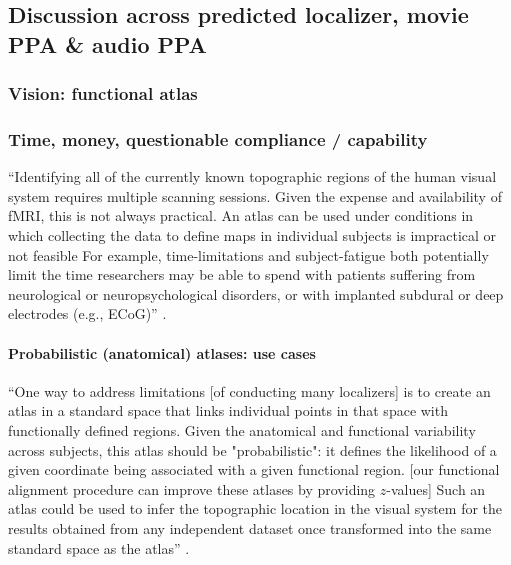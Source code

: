\subsection{Discussion across predicted localizer, movie PPA \& audio PPA}


\subsubsection{Vision: functional atlas}





\subsubsection{Time, money, questionable compliance / capability}

``Identifying all of the currently known topographic regions of the human visual
system requires multiple scanning sessions.
%
Given the expense and availability of fMRI, this is not always practical.
%
An atlas can be used under conditions in which collecting the data to define
maps in individual subjects is impractical or not feasible
%
For example, time-limitations and subject-fatigue both potentially limit the
time researchers may be able to spend with patients suffering from neurological
or neuropsychological disorders, or with implanted subdural or deep electrodes
(e.g., ECoG)'' \citep{wang2015probabilistic}.


\paragraph{Probabilistic (anatomical) atlases: use cases}
%
``One way to address limitations [of conducting many localizers] is to create an
atlas in a standard space that links individual points in that space with
functionally defined regions.
%
Given the anatomical and functional variability across subjects, this atlas
should be "probabilistic":
%
it defines the likelihood of a given coordinate being associated with a given
functional region. [our functional alignment procedure can improve these atlases
by providing $z$-values]
%
Such an atlas could be used to infer the topographic location in the visual
system for the results obtained from any independent dataset once transformed
into the same standard space as the atlas'' \citep{wang2015probabilistic}.

